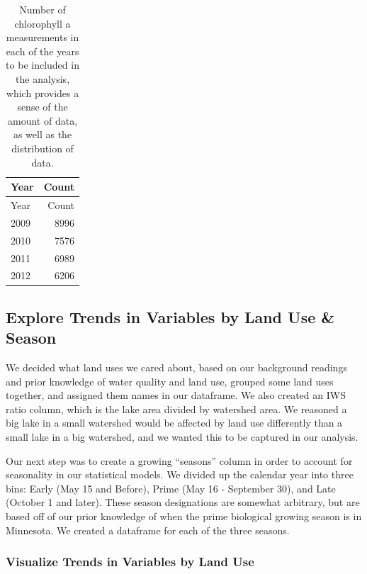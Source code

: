 \documentclass[12pt,]{article}
\begin{document}
\begin{longtable}[]{@{}lr@{}}
\caption{Number of chlorophyll a measurements in each of the years to be
included in the analysis, which provides a sense of the amount of data,
as well as the distribution of data.}\tabularnewline
\toprule
Year & Count\tabularnewline
\midrule
\endfirsthead
\toprule
Year & Count\tabularnewline
\midrule
\endhead
2009 & 8996\tabularnewline
2010 & 7576\tabularnewline
2011 & 6989\tabularnewline
2012 & 6206\tabularnewline
\bottomrule
\end{longtable}

\hypertarget{explore-trends-in-variables-by-land-use-season}{%
\subsection{Explore Trends in Variables by Land Use \&
Season}\label{explore-trends-in-variables-by-land-use-season}}

We decided what land uses we cared about, based on our background
readings and prior knowledge of water quality and land use, grouped some
land uses together, and assigned them names in our dataframe. We also
created an IWS ratio column, which is the lake area divided by watershed
area. We reasoned a big lake in a small watershed would be affected by
land use differently than a small lake in a big watershed, and we wanted
this to be captured in our analysis.

Our next step was to create a growing ``seasons'' column in order to
account for seasonality in our statistical models. We divided up the
calendar year into three bins: Early (May 15 and Before), Prime (May 16
- September 30), and Late (October 1 and later). These season
designations are somewhat arbitrary, but are based off of our prior
knowledge of when the prime biological growing season is in Minnesota.
We created a dataframe for each of the three seasons.

\hypertarget{visualize-trends-in-variables-by-land-use}{%
\subsubsection{Visualize Trends in Variables by Land
Use}\label{visualize-trends-in-variables-by-land-use}}
\end{document}

